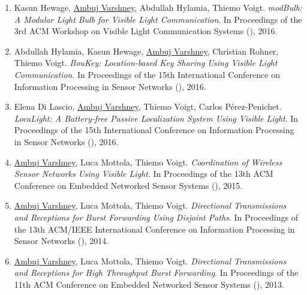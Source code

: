 \begin{enumerate}
\item Kasun Hewage, \underline{Ambuj Varshney}, Abdullah Hylamia\ug, Thiemo Voigt. 
\emph{modBulb: A Modular Light Bulb for Visible Light Communication}. 
In Proceedings of the 3rd ACM Workshop on Visible Light Communication Systems (), 2016.

\item Abdullah Hylamia\ug, Kasun Hewage, \underline{Ambuj Varshney}, Christian Rohner, Thiemo Voigt. 
\emph{BouKey: Location-based Key Sharing Using Visible Light Communication}. 
In Proceedings of the 15th International Conference on Information Processing in Sensor Networks (), 2016.

\item Elena Di Lascio\pg, \underline{Ambuj Varshney}, Thiemo Voigt, Carlos Pérez-Penichet. 
\emph{LocaLight: A Battery-free Passive Localization System Using Visible Light}. 
In Proceedings of the 15th International Conference on Information Processing in Sensor Networks (), 2016.


\item \underline{Ambuj Varshney}, Luca Mottola, Thiemo Voigt. 
\emph{Coordination of Wireless Sensor Networks Using Visible Light}. 
In Proceedings of the 13th ACM Conference on Embedded Networked Sensor Systems (), 2015.


\item \underline{Ambuj Varshney}, Luca Mottola, Thiemo Voigt. 
\emph{Directional Transmissions and Receptions for Burst Forwarding Using Disjoint Paths}. 
In Proceedings of the 13th ACM/IEEE International Conference on Information Processing in Sensor Networks (), 2014.


\item \underline{Ambuj Varshney}, Luca Mottola, Thiemo Voigt. 
\emph{Directional Transmissions and Receptions for High Throughput Burst Forwarding}. 
In Proceedings of the 11th ACM Conference on Embedded Networked Sensor Systems (), 2013.

\end{enumerate}